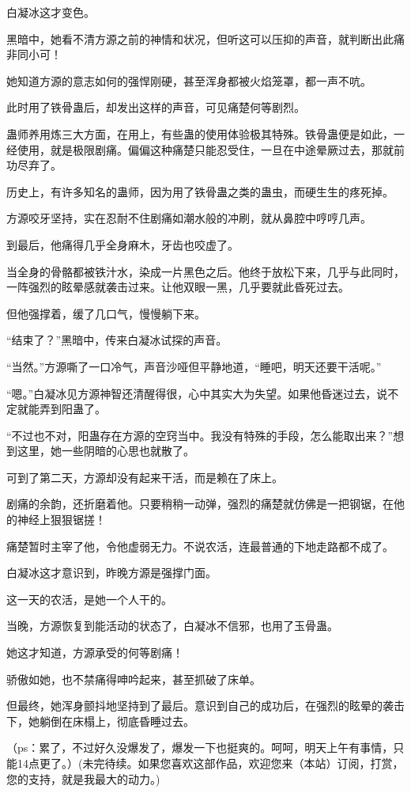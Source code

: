 \begin{this_body}
白凝冰这才变色。

黑暗中，她看不清方源之前的神情和状况，但听这可以压抑的声音，就判断出此痛非同小可！

她知道方源的意志如何的强悍刚硬，甚至浑身都被火焰笼罩，都一声不吭。

此时用了铁骨蛊后，却发出这样的声音，可见痛楚何等剧烈。

蛊师养用炼三大方面，在用上，有些蛊的使用体验极其特殊。铁骨蛊便是如此，一经使用，就是极限剧痛。偏偏这种痛楚只能忍受住，一旦在中途晕厥过去，那就前功尽弃了。

历史上，有许多知名的蛊师，因为用了铁骨蛊之类的蛊虫，而硬生生的疼死掉。

方源咬牙坚持，实在忍耐不住剧痛如潮水般的冲刷，就从鼻腔中哼哼几声。

到最后，他痛得几乎全身麻木，牙齿也咬虚了。

当全身的骨骼都被铁汁水，染成一片黑色之后。他终于放松下来，几乎与此同时，一阵强烈的眩晕感就袭击过来。让他双眼一黑，几乎要就此昏死过去。

但他强撑着，缓了几口气，慢慢躺下来。

“结束了？”黑暗中，传来白凝冰试探的声音。

“当然。”方源嘶了一口冷气，声音沙哑但平静地道，“睡吧，明天还要干活呢。”

“嗯。”白凝冰见方源神智还清醒得很，心中其实大为失望。如果他昏迷过去，说不定就能弄到阳蛊了。

“不过也不对，阳蛊存在方源的空窍当中。我没有特殊的手段，怎么能取出来？”想到这里，她一些阴暗的心思也就散了。

可到了第二天，方源却没有起来干活，而是赖在了床上。

剧痛的余韵，还折磨着他。只要稍稍一动弹，强烈的痛楚就仿佛是一把钢锯，在他的神经上狠狠锯搓！

痛楚暂时主宰了他，令他虚弱无力。不说农活，连最普通的下地走路都不成了。

白凝冰这才意识到，昨晚方源是强撑门面。

这一天的农活，是她一个人干的。

当晚，方源恢复到能活动的状态了，白凝冰不信邪，也用了玉骨蛊。

她这才知道，方源承受的何等剧痛！

骄傲如她，也不禁痛得呻吟起来，甚至抓破了床单。

但最终，她浑身颤抖地坚持到了最后。意识到自己的成功后，在强烈的眩晕的袭击下，她躺倒在床榻上，彻底昏睡过去。

（ps：累了，不过好久没爆发了，爆发一下也挺爽的。呵呵，明天上午有事情，只能14点更了。）(未完待续。如果您喜欢这部作品，欢迎您来（本站）订阅，打赏，您的支持，就是我最大的动力。)

\end{this_body}

